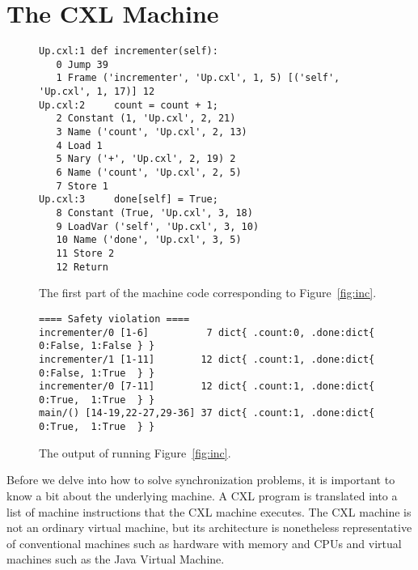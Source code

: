\documentclass{report}
\newenvironment{code}{
\tcolorbox
}{
\endtcolorbox
}
\begin{document}
\chapter{The CXL Machine}
\label{ch:cxlmachine}

\begin{figure}
\begin{code}
\begin{verbatim}
Up.cxl:1 def incrementer(self):
   0 Jump 39
   1 Frame ('incrementer', 'Up.cxl', 1, 5) [('self', 'Up.cxl', 1, 17)] 12
Up.cxl:2     count = count + 1;
   2 Constant (1, 'Up.cxl', 2, 21)
   3 Name ('count', 'Up.cxl', 2, 13)
   4 Load 1
   5 Nary ('+', 'Up.cxl', 2, 19) 2
   6 Name ('count', 'Up.cxl', 2, 5)
   7 Store 1
Up.cxl:3     done[self] = True;
   8 Constant (True, 'Up.cxl', 3, 18)
   9 LoadVar ('self', 'Up.cxl', 3, 10)
   10 Name ('done', 'Up.cxl', 3, 5)
   11 Store 2
   12 Return
\end{verbatim}
\end{code}
\caption{The first part of the machine code corresponding to Figure~\ref{fig:inc}.}
\label{fig:inccode}
\end{figure}

\begin{figure}
\begin{code}
\begin{verbatim}
==== Safety violation ====
incrementer/0 [1-6]          7 dict{ .count:0, .done:dict{ 0:False, 1:False } }
incrementer/1 [1-11]        12 dict{ .count:1, .done:dict{ 0:False, 1:True  } }
incrementer/0 [7-11]        12 dict{ .count:1, .done:dict{ 0:True,  1:True  } }
main/() [14-19,22-27,29-36] 37 dict{ .count:1, .done:dict{ 0:True,  1:True  } }
\end{verbatim}
\end{code}
\caption{The output of running Figure~\ref{fig:inc}.}
\label{fig:incoutput}
\end{figure}

Before we delve into how to solve synchronization problems, it is important
to know a bit about the underlying machine.  A CXL program is translated
into a list of machine instructions that the CXL machine executes.
The CXL machine is not an ordinary virtual machine, but its architecture
is nonetheless representative of conventional machines such as hardware
with memory and CPUs and virtual machines such as the Java Virtual Machine.
\end{document}

